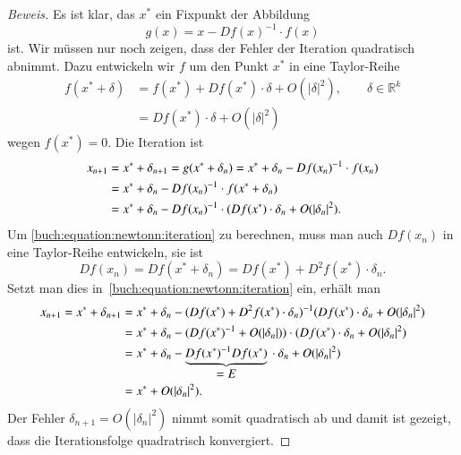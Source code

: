 \begin{proof}[Beweis]
Es ist klar, das $x^*$ ein Fixpunkt der Abbildung
\[
g(x)=x-Df(x)^{-1}\cdot f(x)
\]
ist.
Wir müssen nur noch zeigen, dass der Fehler der Iteration quadratisch
abnimmt.
Dazu entwickeln wir $f$ um den Punkt $x^*$ in eine Taylor-Reihe
\begin{align*}
f(x^* + \delta)
&=
f(x^*) + Df(x^*)\cdot \delta + O(|\delta|^2),\qquad\delta\in\mathbb R^k
\\
&=
Df(x^*)\cdot \delta + O(|\delta|^2)
\end{align*}
wegen $f(x^*)=0$.
Die Iteration ist
\begin{align}
x_{n+1}
&=
x^* +\delta_{n+1}
=
g(x^*+\delta_n)
=
x^*+\delta_n  - Df(x_n)^{-1}\cdot f(x_n)
\notag
\\
&=
x^* + \delta_n -Df(x_n)^{-1}\cdot f(x^* + \delta_n)
\notag
\\
&=
x^* + \delta_n -Df(x_n)^{-1}\cdot
(Df(x^*)\cdot \delta_n + O(|\delta_n|^2).
\label{buch:equation:newtonn:iteration}
\end{align}
Um \eqref{buch:equation:newtonn:iteration}
zu berechnen, muss man auch $Df(x_n)$ in eine Taylor-Reihe entwickeln, sie ist
%
\[
Df(x_n)
=
Df(x^*+\delta_n)
=
Df(x^*) + D^2f(x^*)\cdot\delta_n.
\]
Setzt man dies in~\eqref{buch:equation:newtonn:iteration} ein, erhält man
\begin{align*}
x_{n+1}
=
x^*+\delta_{n+1}
&=
x^* + \delta_n -
(Df(x^*) + D^2f(x^*)\cdot\delta_n)^{-1}
(Df(x^*)\cdot \delta_n + O(|\delta_n|^2)
\\
&=
x^* + \delta_n -
(Df(x^*)^{-1} + O(|\delta_n|))
\cdot
(Df(x^*)\cdot \delta_n + O(|\delta_n|^2)
\\
&=
x^* + \delta_n
- \underbrace{Df(x^*)^{-1}Df(x^*)}_{\displaystyle = E}\mathstrut\cdot\delta_n
+
O(|\delta_n|^2)
\\
&=x^* + O(|\delta_n|^2).
\end{align*}
Der Fehler $\delta_{n+1}=O(|\delta_n|^2)$ nimmt somit quadratisch ab
und damit ist gezeigt, dass die Iterationsfolge quadratrisch
konvergiert.
%
\end{proof}

